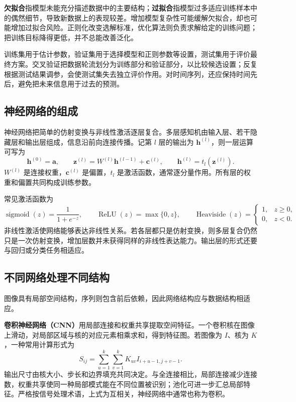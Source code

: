\documentclass[UTF8,fontset=fandol,a4paper,12pt]{ctexart}
\newcommand{\va}{\boldsymbol a}
\theoremstyle{definition}
\begin{document}
\textbf{欠拟合}指模型未能充分描述数据中的主要结构；\textbf{过拟合}指模型过多适应训练样本中的偶然细节，导致新数据上的表现较差。增加模型复杂性可能缓解欠拟合，却也可能增加过拟合风险。正则化改变选解标准，优化算法则负责求解给定的训练问题；把训练目标降得更低，并不总能改善泛化。

训练集用于估计参数，验证集用于选择模型和正则参数等设置，测试集用于评价最终方案。交叉验证把数据轮流划分为训练部分和验证部分，以比较候选设置；反复根据测试结果调参，会使测试集失去独立评价作用。对时间序列，还应保持时间先后，避免把未来信息用于过去的预测。

\subsection{神经网络的组成}
神经网络把简单的仿射变换与非线性激活逐层复合。多层感知机由输入层、若干隐藏层和输出层组成，信息沿前向连接传播。记第 $l$ 层的输出为 $\boldsymbol h^{(l)}$，则一层运算可写为
\[
 \boldsymbol h^{(0)}=\va,\qquad
 \boldsymbol z^{(l)}=W^{(l)}\boldsymbol h^{(l-1)}+\boldsymbol c^{(l)},\qquad
 \boldsymbol h^{(l)}=t_l(\boldsymbol z^{(l)}).
\]
$W^{(l)}$ 是连接权重，$\boldsymbol c^{(l)}$ 是偏置，$t_l$ 是激活函数，通常逐分量作用。所有层的权重和偏置共同构成训练参数。

常见激活函数为
\[
 \operatorname{sigmoid}(z)=\frac1{1+e^{-z}},\qquad
 \operatorname{ReLU}(z)=\max\{0,z\},\qquad
 \operatorname{Heaviside}(z)=
 \begin{cases}1,&z\ge0,\\0,&z<0.\end{cases}
\]
非线性激活使网络能够表达非线性关系。若各层都只是仿射变换，则多层复合仍然只是一次仿射变换，增加层数并未获得同样的非线性表达能力。输出层的形式还要与回归或分类任务相适应。

\subsection{不同网络处理不同结构}
图像具有局部空间结构，序列则包含前后依赖，因此网络结构应与数据结构相适应。

\textbf{卷积神经网络（CNN）}用局部连接和权重共享提取空间特征。一个卷积核在图像上滑动，对局部区域与核的对应元素相乘求和，得到特征图。若图像为 $I$、核为 $K$，一种常用计算形式为
\[
 S_{ij}=\sum_{u=1}^k\sum_{v=1}^k K_{uv}I_{i+u-1,j+v-1}.
\]
输出尺寸由核大小、步长和边界填充共同决定。与全连接相比，局部连接减少连接数，权重共享使同一种局部模式能在不同位置被识别；池化可进一步汇总局部特征。严格按信号处理术语，上式为互相关，神经网络中通常也称为卷积。
\end{document}
